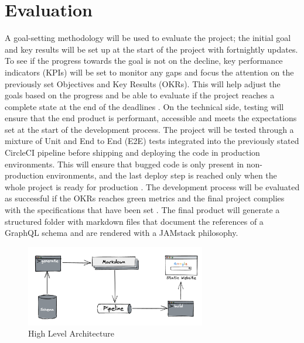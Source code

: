 \section*{Evaluation}
\label{s:Evaluation}
A goal-setting methodology will be used to evaluate the project; the initial
goal and key results will be set up at the start of the project with fortnightly
updates. To see if the progress towards the goal is not on the decline, key
performance indicators (KPIs) will be set to monitor any gaps and focus the
attention on the previously set Objectives and Key Results (OKRs). This will
help adjust the goals based on the progress and be able to evaluate if the
project reaches a complete state at the end of the deadlines
\citep{helmoldLeanManagementKPI2020}. On the technical side, testing will ensure
that the end product is performant, accessible and meets the expectations set at
the start of the development process. The project will be tested through a
mixture of Unit and End to End (E2E) tests integrated into the previously stated
CircleCI pipeline before shipping and deploying the code in production
environments. This will ensure that bugged code is only present in
non-production environments, and the last deploy step is reached only when the
whole project is ready for production \citep{yuUtilisingCIEnvironment2020}. The
development process will be evaluated as successful if the OKRs reaches green
metrics and the final project complies with the specifications that have been
set \citep{helmoldLeanManagementKPI2020}. The final product will generate a
structured folder with markdown files that document the references of a GraphQL
schema and are rendered with a JAMstack philosophy.
\begin{figure}[H]
  \centering
  \includegraphics[width=0.7\textwidth]{figures/architecture}
  \caption{High Level Architecture}
  \label{f:architecture}
\end{figure}
